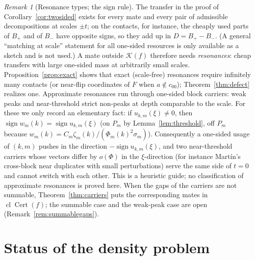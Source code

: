 \documentclass[10pt]{amsart}
\theoremstyle{definition}
\theoremstyle{remark}
\newtheorem{remark}[theorem]{Remark}
\newcommand{\sgn}{\operatorname{sign}}
\newcommand{\Cert}{\operatorname{Cert}}
\newcommand{\cl}{\operatorname{cl}}
\begin{document}
\begin{remark}[Resonance types; the sign rule]\label{rem:resonancetypes}
The transfer in the proof of Corollary~\ref{cor:twosided} exists for every
mate and every pair of admissible decompositions at scales $\pm t$; on the
contacts, for instance, the cheaply used parts of $B_+$ and of $B_-$ have
opposite signs, so they add up in $D=B_+-B_-$.  (A general ``matching at
scale'' statement for all one-sided resources is only available as a
sketch and is not used.)  A mate outside $\mathcal
K(f)$ therefore needs \emph{resonances}: cheap transfers with large
one-sided mass at arbitrarily small scales.  Proposition~\ref{prop:exact}
shows that exact (scale-free) resonances require infinitely many contacts
(or near-flip coordinates of $F$ when $a\notin c_{00}$);
Theorem~\ref{thm:defect} realizes one.  Approximate resonances run through
one-sided block carriers: weak peaks and near-threshold strict non-peaks
at depth comparable to the scale.  For these we only record an elementary
fact: if $u_{k,m}(\xi)\ne0$, then $\sgn w_m(k)=\sgn u_{k,m}(\xi)$ (on $P_m$
by Lemma~\ref{lem:threshold}, off $P_m$ because $w_m(k)=C_m\zeta_m(k)/
(\Phi_m(k)^2\sigma_m)$).  Consequently a one-sided usage of $(k,m)$ pushes in
the direction $-\sgn u_{k,m}(\xi)$, and two near-threshold carriers whose
vectors differ by $o(\Phi)$ in the $\xi$-direction (for instance Mart\'in's
cross-block near duplicates with small perturbations) serve the same side
of $t=0$ and cannot switch with each other.  This is a heuristic guide; no
classification of approximate resonances is proved here.  When the gaps of
the carriers are not summable, Theorem~\ref{thm:carriers} puts the
corresponding mates in $\cl\Cert(f)$; the summable case and the weak-peak
case are open (Remark~\ref{rem:summablegaps}).
\end{remark}

\section{Status of the density problem}\label{sec:status}
\end{document}
